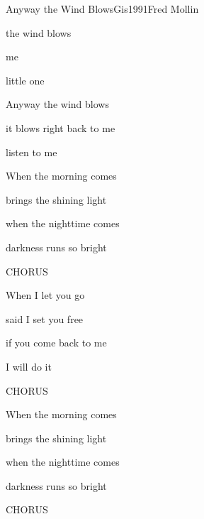 \documentclass[a4paper,draft]{book}
\begin{document}
\begin{song}{Anyway the Wind Blows}{Gis}{1991}{Fred Mollin}{}{}
 
  \begin{SBChorus}
     the wind blows 
    
     me
    
    little one

    Anyway the wind blows
    
    it blows right back to me
    
    listen to me
  \end{SBChorus}

	\begin{SBVerse}
	  When the morning comes
	  
	  brings the shining light
	  
	  when the nighttime comes
	  
	  darkness runs so bright
	\end{SBVerse}

  \begin{SBChorus}
    CHORUS
  \end{SBChorus}

	\begin{SBVerse}
	  When I let you go

	  said I set you free

	  if you come back to me

	  I will do it
	\end{SBVerse}

  \begin{SBChorus}
    CHORUS
  \end{SBChorus}

	\begin{SBVerse}
	  When the morning comes

	  brings the shining light

	  when the nighttime comes

	  darkness runs so bright
	\end{SBVerse}

  \begin{SBChorus}
    CHORUS
  \end{SBChorus}

\end{song}
\end{document}
